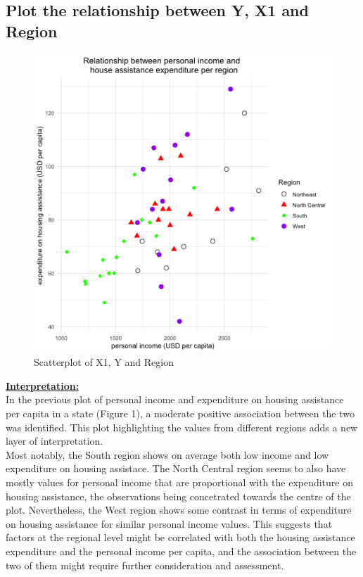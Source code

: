 \documentclass[12pt,letterpaper]{article}
\begin{document}
\subsection*{Plot the relationship between Y, X1 and Region }
 
\vspace{.5cm}
\begin{figure}[h!]\centering
	\caption{\footnotesize Scatterplot of X1, Y and Region}
	\label{fig:plot_8}
	\includegraphics[width=.7\textwidth]{scatter_x1_y_reg.png}
\end{figure}
\vspace{.5cm}
\underline{\textbf{Interpretation:}}\\[.3cm] In the previous plot of personal income and expenditure on housing assistance per capita in a state (Figure 1), a moderate positive association between the two was identified. This plot highlighting the values from different regions adds a new layer of interpretation. \\ Most notably, the South region shows on average both low income and low expenditure on housing assistace. The North Central region seems to also have mostly values for personal income that are proportional with the expenditure on housing assistance, the observations being concetrated towards the centre of the plot. Nevertheless, the West region shows some contrast in terms of expenditure on housing assistance for similar personal income values. This suggests that factors at the regional level might be correlated with both the housing assistance expenditure and the personal income per capita, and the association between the two of them might require further consideration and assessment. 
\end{document}
